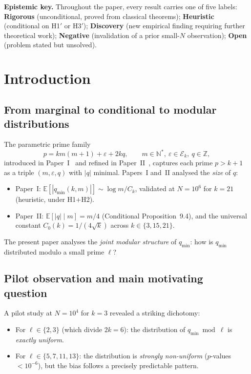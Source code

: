 \documentclass[11pt,a4paper]{article}
\theoremstyle{plain}
\theoremstyle{definition}
\newcommand{\qmin}{q_{\min}}
\newcommand{\Z}{\mathbb{Z}}
\newcommand{\N}{\mathbb{N}}
\newcommand{\E}{\mathbb{E}}
\newcommand{\eps}{\varepsilon}
\newcommand{\Eclass}{\mathcal{E}}
\begin{document}
\begin{heuristicbox}
\noindent\textbf{Epistemic key.} Throughout the paper, every result carries one of
five labels: \textbf{Rigorous} (unconditional, proved from classical theorems);
\textbf{Heuristic} (conditional on H1$'$ or H3$'$); \textbf{Discovery} (new
empirical finding requiring further theoretical work); \textbf{Negative}
(invalidation of a prior small-$N$ observation); \textbf{Open} (problem stated
but unsolved).
\end{heuristicbox}

\tableofcontents

\section{Introduction}
\label{sec:intro}

\subsection{From marginal to conditional to modular distributions}

The parametric prime family
\begin{equation}
p = km(m+1) + \eps + 2kq, \qquad m \in \N^*,\ \eps \in \Eclass_k,\ q \in \Z,
\label{eq:family}
\end{equation}
introduced in Paper~I~\cite{paper1} and refined in Paper~II~\cite{paper2}, captures
each prime $p > k+1$ as a triple $(m, \eps, q)$ with $|q|$ minimal. Papers~I and~II
analysed the \emph{size} of $q$:

\begin{itemize}[leftmargin=*]
\item Paper~I: $\E[|\qmin(k, m)|] \sim \log m / C_k$, validated at $N = 10^6$ for $k=21$
(heuristic, under H1+H2).
\item Paper~II: $\E[|q| \mid m] = m/4$ (Conditional Proposition~9.4), and the
universal constant $C_0(k) = 1/(4\sqrt{k})$ across $k \in \{3, 15, 21\}$.
\end{itemize}

The present paper analyses the \emph{joint modular structure} of $\qmin$: how is
$\qmin$ distributed modulo a small prime $\ell$?

\subsection{Pilot observation and main motivating question}

A pilot study at $N = 10^4$ for $k = 3$ revealed a striking dichotomy:
\begin{itemize}[leftmargin=*]
\item For $\ell \in \{2, 3\}$ (which divide $2k = 6$): the distribution of
$\qmin \bmod \ell$ is \emph{exactly uniform}.
\item For $\ell \in \{5, 7, 11, 13\}$: the distribution is \emph{strongly
non-uniform} ($p$-values $< 10^{-6}$), but the bias follows a precisely
predictable pattern.
\end{itemize}
\end{document}

